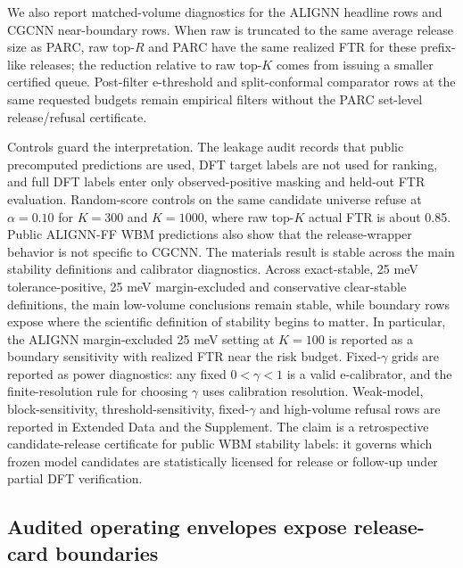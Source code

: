 \documentclass[10pt,twocolumn]{article}
\begin{document}
We also report matched-volume diagnostics for the ALIGNN headline rows and CGCNN near-boundary rows.
When raw is truncated to the same average release size as PARC, raw top-\(R\) and PARC have the same realized FTR for these prefix-like releases; the reduction relative to raw top-\(K\) comes from issuing a smaller certified queue.
Post-filter e-threshold and split-conformal comparator rows at the same requested budgets remain empirical filters without the PARC set-level release/refusal certificate.

Controls guard the interpretation.
The leakage audit records that public precomputed predictions are used, DFT target labels are not used for ranking, and full DFT labels enter only observed-positive masking and held-out FTR evaluation.
Random-score controls on the same candidate universe refuse at \(\alpha=0.10\) for \(K=300\) and \(K=1000\), where raw top-\(K\) actual FTR is about 0.85.
Public ALIGNN-FF WBM predictions also show that the release-wrapper behavior is not specific to CGCNN.
The materials result is stable across the main stability definitions and calibrator diagnostics.
Across exact-stable, 25 meV tolerance-positive, 25 meV margin-excluded and conservative clear-stable definitions, the main low-volume conclusions remain stable, while boundary rows expose where the scientific definition of stability begins to matter.
In particular, the ALIGNN margin-excluded 25 meV setting at \(K=100\) is reported as a boundary sensitivity with realized FTR near the risk budget.
Fixed-\(\gamma\) grids are reported as power diagnostics: any fixed \(0<\gamma<1\) is a valid e-calibrator, and the finite-resolution rule for choosing \(\gamma\) uses calibration resolution.
Weak-model, block-sensitivity, threshold-sensitivity, fixed-\(\gamma\) and high-volume refusal rows are reported in Extended Data and the Supplement.
The claim is a retrospective candidate-release certificate for public WBM stability labels: it governs which frozen model candidates are statistically licensed for release or follow-up under partial DFT verification.

\subsection{Audited operating envelopes expose release-card boundaries}
\end{document}
